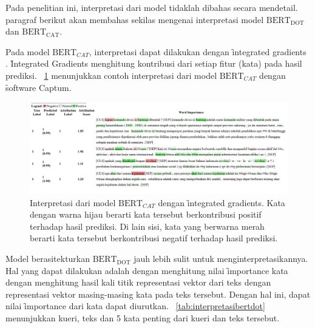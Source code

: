 Pada penelitian ini, interpretasi dari model tidaklah dibahas secara mendetail. paragraf berikut akan membahas sekilas mengenai interpretasi model $\text{BERT}_{\text{DOT}}$ dan $\text{BERT}_{\text{CAT}}$.

Pada model $\text{BERT}_{CAT}$, interpretasi dapat dilakukan dengan \f{integrated gradients} \citep{integratedgradient}. \f{Integrated Gradients} menghitung kontribusi dari setiap fitur (kata) pada hasil prediksi. \pic~\ref{fig:InterpretasiBERTCAT} menunjukkan contoh interpretasi dari model $\text{BERT}_{CAT}$ dengan \f{software} Captum.

\begin{figure}
    \centering
    \includegraphics[width=1\textwidth]{assets/pics/IGBERTCAT.png}
    \caption{Interpretasi dari model $\text{BERT}_{CAT}$ dengan \f{integrated gradients}. Kata dengan warna hijau berarti kata tersebut berkontribusi positif terhadap hasil prediksi. Di lain sisi, kata yang berwarna merah berarti kata tersebut berkontribusi negatif terhadap hasil prediksi.}
    \label{fig:InterpretasiBERTCAT}
\end{figure}

Model berasitekturkan $\text{BERT}_{\text{DOT}}$ jauh lebih sulit untuk menginterpretasikannya. Hal yang dapat dilakukan adalah dengan menghitung nilai \f{importance} kata dengan menghitung hasil kali titik representasi vektor dari teks dengan representasi vektor masing-masing kata pada teks tersebut. Dengan hal ini, dapat nilai \f{importance} dari kata dapat diurutkan. \tab~\ref{tab:interpretasibertdot} menunjukkan kueri, teks dan 5 kata penting dari kueri dan teks tersebut.

